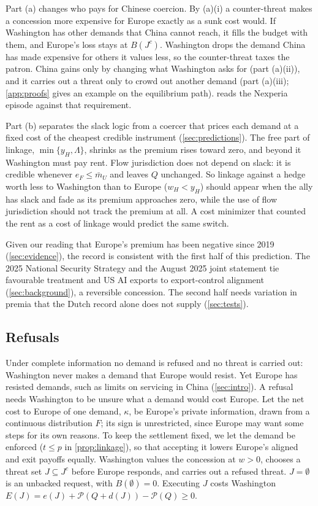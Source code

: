 Part (a) changes who pays for Chinese coercion. By (a)(i) a counter-threat makes a concession more expensive for Europe exactly as a sunk cost would. If Washington has other demands that China cannot reach, it fills the budget with them, and Europe's loss stays at $B(J^c)$. Washington drops the demand China has made expensive for others it values less, so the counter-threat taxes the patron. China gains only by changing what Washington asks for (part (a)(ii)), and it carries out a threat only to crowd out another demand (part (a)(iii); \cref{app:proofs} gives an example on the equilibrium path).  reads the Nexperia episode against that requirement.

Part (b) separates the slack logic from a coercer that prices each demand at a fixed cost of the cheapest credible instrument (\cref{sec:predictions}). The free part of linkage, $\min\{y_H,\Lambda\}$, shrinks as the premium rises toward zero, and beyond it Washington must pay rent. Flow jurisdiction does not depend on slack: it is credible whenever $e_F\le\bar m_U$ and leaves $Q$ unchanged. So linkage against a hedge worth less to Washington than to Europe ($w_H<y_H$) should appear when the ally has slack and fade as its premium approaches zero, while the use of flow jurisdiction should not track the premium at all. A cost minimizer that counted the rent as a cost of linkage would predict the same switch.

Given our reading that Europe's premium has been negative since 2019 (\cref{sec:evidence}), the record is consistent with the first half of this prediction. The 2025 National Security Strategy and the August 2025 joint statement tie favourable treatment and US AI exports to export-control alignment (\cref{sec:background}), a reversible concession. The second half needs variation in premia that the Dutch record alone does not supply (\cref{sec:tests}).

\subsection{Refusals}\label{sec:refusals}

Under complete information no demand is refused and no threat is carried out: Washington never makes a demand that Europe would resist. Yet Europe has resisted demands, such as limits on servicing in China (\cref{sec:intro}). A refusal needs Washington to be unsure what a demand would cost Europe. Let the net cost to Europe of one demand, $\kappa$, be Europe's private information, drawn from a continuous distribution $F$; its sign is unrestricted, since Europe may want some steps for its own reasons. To keep the settlement fixed, we let the demand be enforced ($t\le p$ in \cref{prop:linkage}), so that accepting it lowers Europe's aligned and exit payoffs equally. Washington values the concession at $w>0$, chooses a threat set $J\subseteq J^c$ before Europe responds, and carries out a refused threat. $J=\emptyset$ is an unbacked request, with $B(\emptyset)=0$. Executing $J$ costs Washington $E(J)=e(J)+\mathcal P(Q+d(J))-\mathcal P(Q)\ge 0$.

